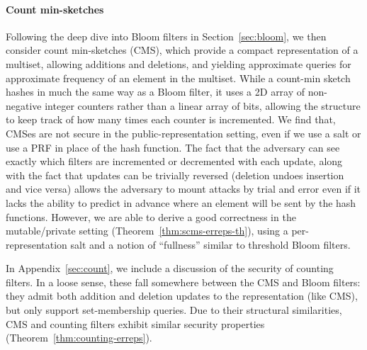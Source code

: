 \paragraph{Count min-sketches}
Following the deep dive into Bloom filters in Section~\ref{sec:bloom}, we then
consider count min-sketches (CMS), which provide a compact representation of a
multiset, allowing additions and deletions, and yielding approximate queries for
approximate frequency of an element in the multiset. While a count-min sketch
hashes in much the same way as a Bloom filter, it uses a 2D array of non-negative
integer counters rather than a linear array of bits, allowing the structure to
keep track of how many times each counter is incremented.
%
We find that, CMSes are not secure in the
public-representation setting, even if we use a salt or use a PRF in place of
the hash function. The fact that the adversary can see exactly which filters are
incremented or decremented with each update, along with the fact that updates can be
trivially reversed (deletion undoes insertion and vice versa) allows the
adversary to mount attacks by trial and error even if it lacks the ability to
predict in advance where an element will be sent by the hash functions.
%
However, we are able to derive a good correctness in the mutable/private setting
(Theorem~\ref{thm:scms-erreps-th}), using a per-representation salt and a
notion of ``fullness'' similar to threshold Bloom filters.

In Appendix~\ref{sec:count}, we include a discussion of the security
of counting filters.
%
In a loose sense, these fall somewhere between the CMS and Bloom
filters: they admit both addition and deletion
updates to the representation (like CMS), but only support set-membership queries.
%
Due to their structural similarities, CMS and counting filters
exhibit similar security properties (Theorem~\ref{thm:counting-erreps}).


